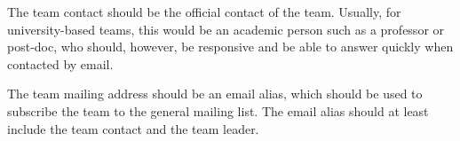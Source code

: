 The team contact should be the official contact of the team. Usually, for university-based teams, this would be an academic person such as a professor or post-doc, who should, however, be responsive and be able to answer quickly when contacted by email.
\par
The team mailing address should be an email alias, which should be used to subscribe the team to the general \RCAW mailing list. The email alias should at least include the team contact and the team leader.
